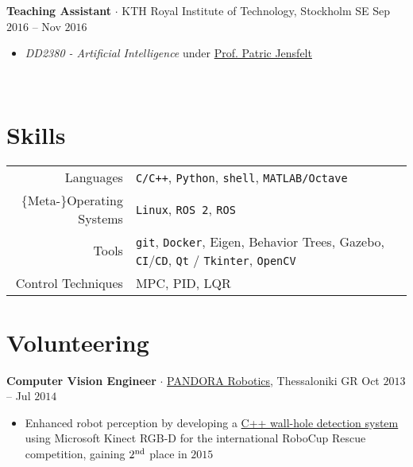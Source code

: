 \documentclass[a4paper,10pt,twoside]{article}
\newcommand{\verticalspacebetweensections}{\vspace{0.4em}}
\newcommand{\verticalspacebetweensectionandcontent}{\vspace{0.4em}}
\begin{document}
  \noindent\textbf{Teaching Assistant} $\cdot$ KTH Royal Institute of Technology, Stockholm SE \hfill {\small Sep $2016$ -- Nov $2016$} \\
  \begin{minipage}[t]{\textwidth}
    \begin{itemize}
      \item \textit{DD2380 - Artificial Intelligence} under \href{https://www.kth.se/profile/patric}{Prof. Patric Jensfelt}
    \end{itemize}
  \end{minipage} \\[-1em]
\verticalspacebetweensections

\section{\textbf{Skills}}\verticalspacebetweensectionandcontent

\begin{tabular}{rp{12cm}}
Languages & \texttt{C/C++}, \texttt{Python}, \texttt{shell}, \texttt{MATLAB/Octave} \\
$\{$Meta-$\}$Operating Systems & \texttt{Linux}, \texttt{ROS 2}, \texttt{ROS} \\
  Tools & \texttt{git}, \texttt{Docker}, Eigen, Behavior Trees, Gazebo, \texttt{CI}/\texttt{CD}, \texttt{Qt} / \texttt{Tkinter}, \texttt{OpenCV} \\
Control Techniques & MPC, PID, LQR
\end{tabular}
\verticalspacebetweensections

\section{\textbf{Volunteering}}\verticalspacebetweensectionandcontent

\noindent \textbf{Computer Vision Engineer} $\cdot$ \href{https://issel.ee.auth.gr/pandora-robotics/}{PANDORA Robotics}, Thessaloniki GR \hfill {\small Oct $2013$ -- Jul $2014$}
  \begin{minipage}[t]{\textwidth}
    \begin{itemize}
      \item Enhanced robot perception by developing a \href{https://github.com/li9i/pandora\_vision\_2014}{C++ wall-hole detection system} using Microsoft Kinect RGB-D for the international RoboCup Rescue competition, gaining $2^{\textnormal{nd}}$ place in $2015$
    \end{itemize}
  \end{minipage}
\verticalspacebetweensections
\end{document}
